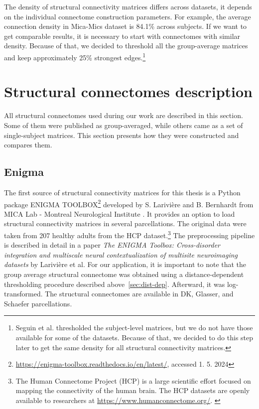 The density of structural connectivity matrices differs across da\-ta\-sets, it depends on the individual connectome construction parameters. For example, the average connection density in Mica-Mics dataset is  84.1\% across subjects. \cite{seguin_communication_2023} If we want to get comparable results, it is necessary to start with connectomes with similar density. Because of that, we decided to threshold all the group-average matrices and keep approximately 25\% strongest edges.\footnote{Seguin et al. thresholded the subject-level matrices, but we do not have those available for some of the datasets. Because of that, we decided to do this step later to get the same density for all structural connectivity matrices.}

\section{Structural connectomes description}

All structural connectomes used during our work are described in this section. Some of them were published as group-averaged, while others came as a set of single-subject matrices. This section presents how they were constructed and compares them. 

\subsection{Enigma}\label{sec:enigma}

The first source of structural connectivity matrices for this thesis is a Python package ENIGMA TOOLBOX\footnote{\url{https://enigma-toolbox.readthedocs.io/en/latest/}, accessed 1. 5. 2024} developed by S. Larivière and B. Bernhardt from MICA Lab - Montreal Neurological Institute \cite{lariviere_enigma_2020}. It provides an option to load structural connectivity matrices in several parcellations. The original data were taken from 207 healthy adults from the HCP dataset.\footnote{The Human Connectome Project (HCP) is a large scientific effort focused on mapping the connectivity of the human brain. The HCP datasets are openly available to researchers at \url{https://www.humanconnectome.org/}. \cite{van_essen_human_2012}} The preprocessing pipeline is described in detail in a paper \textit{The ENIGMA Toolbox: Cross-disorder integration and multiscale neural contextualization of multisite neuroimaging datasets} by Larivière et al. For our application, it is important to note that the group average structural connectome was obtained using a distance-dependent thresholding procedure described above~\ref{sec:dist-dep}. Afterward, it was log-transformed. The structural connectomes are available in DK, Glasser, and Schaefer parcellations. 

